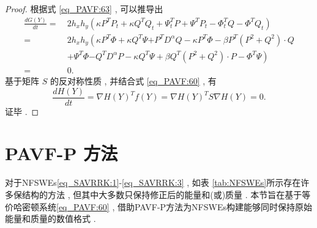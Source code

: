 \begin{proof}
	根据式 \eqref{eq_PAVF:63} , 可以推导出
	\begin{align}\label{eq_PAVF:64}
		\frac{d G(Y)}{d t}=&~2 h_{x} h_{y}\left(\kappa P^{T}P_t+\kappa Q^{T}Q_t+\Psi^{T}_t P+\Psi^{T}P_{t}-\varPhi^{T}_t Q-\varPhi^{T}Q_{t}\right)\nonumber\\
		=&~2 h_{x} h_{y}\left(\kappa P^{T}\varPhi+\kappa Q^{T}\Psi {+ P^{T}D^{\alpha}Q}-\kappa P^{T}\varPhi-\beta P^{T}\left( P^{2}+Q^{2}\right)\cdot Q\right . \nonumber\\
		&~\left . +\Psi^{T}\varPhi{-Q^{T}D^{\alpha}P}-\kappa Q^{T}\Psi+\beta Q^{T}\left( P^{2}+Q^{2}\right)\cdot P-\varPhi^{T}\Psi\right)\nonumber\\
		=&~0 . 
		\end{align}
		基于矩阵 $S$ 的反对称性质 , 并结合式 \eqref{eq_PAVF:60} , 有
		\begin{equation}\label{eq_PAVF:65}
		\frac{d H(Y)}{d t}=\nabla H(Y)^{T} f(Y)=\nabla H(Y)^{T} S \nabla H(Y)=0  . 
		\end{equation}
		证毕 . 
		\end{proof}

\section{PAVF-P 方法}\label{Section_PAVF: 3}
对于NFSWEs\eqref{eq_SAVRRK:1}-\eqref{eq_SAVRRK:3} , 如表 \ref{tab:NFSWEs}所示存在许多保结构的方法 , 但其中大多数只保持修正后的能量和(或)质量 . 
本节旨在基于等价哈密顿系统\eqref{eq_PAVF:60} , 借助PAVF-P方法\cite{caiPartitionedAveragedVector2018}为NFSWEs构建能够同时保持原始能量和质量的数值格式 . 

